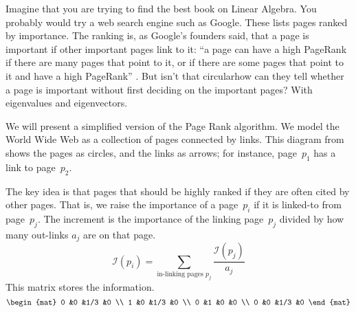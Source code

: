 
Imagine that you are trying to find the best book
on Linear Algebra.
You probably would try a web search engine such as Google.
These lists pages ranked by importance.
The ranking is, as Google's founders said, 
that a page is important if other important
pages link to it:
``a page can have a high PageRank if there are many pages that point
to it, or if there are some pages that point to it and have a high PageRank''
\cite{BrinPage}.
But isn't that circular\Dash how can they tell whether a page is
important without first deciding on the important pages?
With eigenvalues and eigenvectors.

We will present a simplified version of the Page Rank algorithm. 
We model the World Wide Web as a collection of pages connected by
links.
This diagram from \cite{Wills}
shows the pages as circles, and the links as arrows;
for instance, page~$p_1$ has a link to page~$p_2$. 
\begin{center}  %
  \shortstack{\rule{0em}{1.5ex} \\ \texttt{[image: ch5.9]} \\ \rule{0em}{1.5ex}}
\end{center}

The key idea is that pages that should be highly ranked if they are
often cited by other pages.
That is, we raise the importance of a page~$p_i$
if it is linked-to from page~$p_j$.
The increment is the importance of the linking page~$p_j$
divided by how many out-links $a_j$ are on that page.
\begin{equation*}
  \mathcal{I}(p_i)=\sum_{\text{in-linking pages $p_j$}}  \frac{\mathcal{I}(p_j)}{a_j}
\end{equation*}
This matrix stores the information.
\begin{equation*}
  \begin{mat}
    0   &0  &1/3  &0   \\
    1   &0  &1/3  &0   \\
    0   &1  &0    &0 \\
    0   &0  &1/3  &0
  \end{mat}
\end{equation*}

